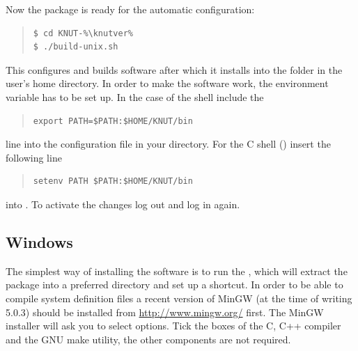 \documentclass[10pt,a4paper]{ddedoc}
\begin{document}
Now the package is ready for the automatic configuration:
{ \small \begin{quote} \begin{lstlisting}[basicstyle=\tt,frame=single]
$ cd KNUT-%\knutver%
$ ./build-unix.sh
\end{lstlisting} \end{quote} } \noindent
This configures and builds software after which it installs into the
 folder in the user's home directory.
In order to make the software work, the  environment variable has
to be set up. In the case of the  shell include the
{ \small \begin{quote} \begin{lstlisting}[basicstyle=\tt,frame=single]
export PATH=$PATH:$HOME/KNUT/bin
\end{lstlisting} \end{quote} } \noindent
line into the  configuration file in your 
directory. For the C shell () insert the following line
{ \small \begin{quote} \begin{lstlisting}[basicstyle=\tt,frame=single]
setenv PATH $PATH:$HOME/KNUT/bin
\end{lstlisting} \end{quote} } \noindent
into . To activate the changes log out and log in again.

\subsection{Windows}

The simplest way of installing the software is to run the
, which will extract the package into a
preferred directory and set up a  shortcut. In order to be
able to compile system definition files a recent version of MinGW (at the time
of writing 5.0.3) should be installed from \url{http://www.mingw.org/} first.
The MinGW installer will ask you to select options. Tick the boxes of the C, C++
compiler and the GNU make utility, the other components are not required.
\end{document}
